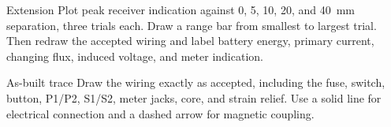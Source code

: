 \begin{telospanel}{Extension}
Plot peak receiver indication against 0, 5, 10, 20, and \qty{40}{mm} separation,
three trials each. Draw a range bar from smallest to largest trial. Then redraw
the accepted wiring and label battery energy, primary current, changing flux,
induced voltage, and meter indication.
\end{telospanel}

\begin{telospanel}{As-built trace}
\small Draw the wiring exactly as accepted, including the fuse, switch,
button, P1/P2, S1/S2, meter jacks, core, and strain relief. Use a solid line for
electrical connection and a dashed arrow for magnetic coupling.
\par\vspace{2.4cm}
\end{telospanel}

